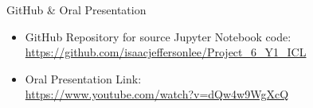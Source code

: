 \documentclass[6pt, final, xcolor=table]{beamer}
\newlength{\sepwidth}
\newlength{\colwidth}
\newcommand{\separatorcolumn}{\begin{column}{\sepwidth}\end{column}}
\begin{document}
\begin{frame}[t]
\begin{columns}[t]
\begin{column}{\colwidth}
  \begin{block}{GitHub \& Oral Presentation}
  \begin{itemize}
      \item GitHub Repository for source Jupyter Notebook code:  \url{https://github.com/isaacjeffersonlee/Project_6_Y1_ICL}
      \item Oral Presentation Link:  \\
      \url{https://www.youtube.com/watch?v=dQw4w9WgXcQ}
  \end{itemize}

 

  \end{block}

\end{column}

\separatorcolumn
\end{columns}
\end{frame}
\end{document}
